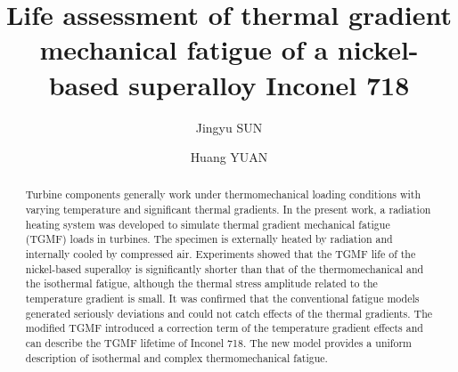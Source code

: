 \documentclass[preprint,5p,twocolumn,10pt,sort&compress]{elsarticle}
\begin{document}


\renewcommand\figureautorefname{Fig.}


\begin{frontmatter}



\title{Life assessment of thermal gradient mechanical fatigue of a nickel-based superalloy Inconel 718}


\author{Jingyu SUN}
\author{Huang YUAN}

\address{School of Aerospace Engineering, Tsinghua University, Beijing, China}

\begin{abstract}
Turbine components generally work under thermomechanical  loading conditions  with varying temperature and significant thermal gradients. In the present work, a radiation heating system was developed to simulate thermal gradient mechanical fatigue (TGMF) loads in turbines. The specimen is externally heated by radiation and internally cooled by compressed air. Experiments showed that the TGMF life of the nickel-based superalloy is significantly shorter than that of  the thermomechanical and the isothermal fatigue, although the thermal stress amplitude related to the temperature gradient is small. It was confirmed that the conventional fatigue models generated seriously deviations and could not catch effects of the thermal gradients. The modified TGMF introduced  a correction term of the temperature gradient effects and can describe the TGMF lifetime of Inconel 718. The new model provides a uniform description of isothermal and complex thermomechanical fatigue. 
\end{abstract}


\end{frontmatter}
\end{document}
